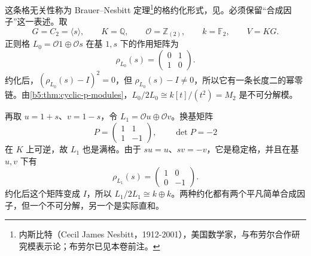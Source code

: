 这条格无关性称为 Brauer--Nesbitt 定理\footnote{内斯比特（Cecil James Nesbitt，1912-2001），美国数学家，与布劳尔合作研究模表示论；布劳尔已见本卷前注。}的格约化形式，见\cite[Theorem 9.4.8]{Webb2016FiniteGroupRepresentations}。必须保留“合成因子”这一表述。取
\[
	G=C_2=\langle s\rangle,\qquad K=\mathbb Q,\qquad \mathcal O=\mathbb Z_{(2)},\qquad k=\mathbb F_2,\qquad V=KG.
\]
正则格 \(L_0=\mathcal O1\oplus\mathcal Os\) 在基 \(1,s\) 下的作用矩阵为
\[
	\rho_{L_0}(s)=\begin{pmatrix}0&1\\1&0\end{pmatrix}.
\]
约化后，\((\rho_{L_0}(s)-I)^2=0\)，但 \(\rho_{L_0}(s)-I\ne0\)，所以它有一条长度二的幂零链。由\cref{b5:thm:cyclic-p-modules}，\(L_0/2L_0\cong k[t]/(t^2)=M_2\) 是不可分解模。

\ProseParagraphBreak
再取 \(u=1+s\)、\(v=1-s\)，令 \(L_1=\mathcal Ou\oplus\mathcal Ov\)。换基矩阵
\[
	P=\begin{pmatrix}1&1\\1&-1\end{pmatrix},\qquad \det P=-2
\]
在 \(K\) 上可逆，故 \(L_1\) 也是满格。由于 \(su=u\)、\(sv=-v\)，它是稳定格，并且在基 \(u,v\) 下有
\[
	\rho_{L_1}(s)=\begin{pmatrix}1&0\\0&-1\end{pmatrix}.
\]
约化后这个矩阵变成 \(I\)，所以 \(L_1/2L_1\cong k\oplus k\)。两种约化都有两个平凡简单合成因子，但一个不可分解，另一个是实际直和。

